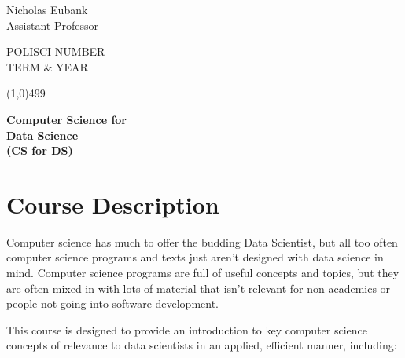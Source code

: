 \documentclass[12pt]{article}
\begin{document}
\singlespacing






\thispagestyle{empty}
\begin{minipage}[t]{.5\textwidth}
	Nicholas Eubank \\
	 Assistant Professor\\
     \vspace*{0.1cm}
\end{minipage}
\begin{minipage}[t]{.5\textwidth}
	\begin{flushright}  POLISCI NUMBER\\
	TERM \& YEAR\\
    \vspace*{0.1cm}
\end{flushright}
\end{minipage}


\line(1,0){499}

\vspace{.35in}

\begin{center}
	\textbf{\LARGE{Computer Science for} }\\
	\vspace*{.05in}
	\textbf{\LARGE{Data Science} } \\
	\vspace*{.05in}
	\textbf{\LARGE (CS for DS)}
\end{center}








\section{Course Description}


Computer science has much to offer the budding Data Scientist, but all too often computer science programs and texts just aren't designed with data science in mind. Computer science programs are full of useful concepts and topics, but they are often mixed in with lots of material that isn't relevant for non-academics or people not going into software development.

This course is designed to provide an introduction to key computer science concepts of relevance to data scientists in an applied, efficient manner, including:
\end{document}
